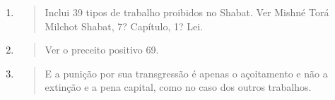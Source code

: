 \begin{enumerate}
\def\labelenumi{\arabic{enumi}.}
\setcounter{enumi}{436}
\item
 \begin{quote}
 Inclui 39 tipos de trabalho proibidos no Shabat. Ver Mishné Torá
 Milchot Shabat, 7? Capítu­lo, 1? Lei.
 \end{quote}
\item
 \begin{quote}
 Ver o preceito positivo 69.
 \end{quote}
\item
 \begin{quote}
 E a punição por sua transgressão é apenas o açoitamento e não a
 extinção e a pena capital, como no caso dos outros trabalhos.
 \end{quote}
\end{enumerate}

